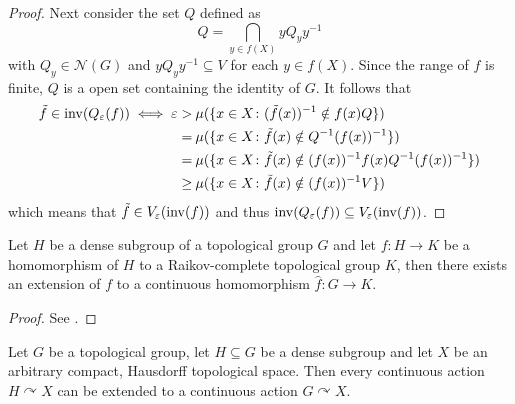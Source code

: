 \begin{proof}
  Next consider the set $Q$ defined as \[ Q = \bigcap\limits_{y \in f(X)}yQ_yy^{-1}\] with $Q_y \in \mathcal{N}(G)$ and $yQ_yy^{-1} \subseteq V$ for each $y \in f(X)$. Since the range of $f$ is finite, $Q$ is a open set containing the identity of $G$.
  It follows that
  \begin{align*}
    \tilde{f} \in {\rm inv}(Q_\varepsilon(f)) \iff \varepsilon > \: &\mu(\{x \in X\colon (\tilde{f}(x))^{-1} \notin f(x)Q\}) \\
    = \: &\mu(\{x \in X\colon \tilde{f}(x) \notin Q^{-1}(f(x))^{-1}\})\\
    = \: &\mu(\{x \in X\colon \tilde{f}(x) \notin (f(x))^{-1}f(x)Q^{-1}(f(x))^{-1}\})\\
    \geq \: &\mu(\{x \in X\colon \tilde{f}(x) \notin (f(x))^{-1}V\})             
  \end{align*}
  which means that $\tilde{f} \in V_{\varepsilon}({\rm inv}(f))$ and thus ${\rm inv}(Q_\varepsilon(f)) \subseteq V_{\varepsilon}({\rm inv}(f))$.
\end{proof}

\begin{lemma}\label{lem:contextrai}
  Let $H$ be a dense subgroup of a topological group $G$ and let $f\colon H \to K$ be a homomorphism of $H$ to a Raikov-complete topological group $K$, then there exists an extension of $f$ to a continuous homomorphism $\hat{f}\colon G \to K$.
\end{lemma}

\begin{proof}
  See \cite[Proposition 3.6.12]{atop2008}.
\end{proof}

\begin{thm}
  Let $G$ be a topological group, let $H \subseteq G$ be a dense subgroup and let $X$ be an arbitrary compact, Hausdorff topological space.
  Then every continuous action $H \curvearrowright X$ can be extended to a continuous action $G \curvearrowright X$.
\end{thm}

